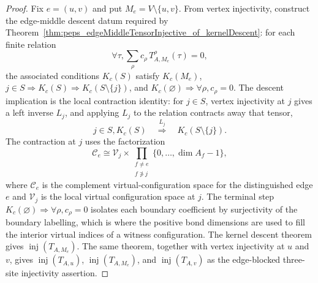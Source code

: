 \begin{proof}\leanok
    Fix $e=(u,v)$ and put $M_e=V\setminus\{u,v\}$. From vertex injectivity,
    construct the edge-middle descent datum required by
    Theorem~\ref{thm:peps_edgeMiddleTensorInjective_of_kernelDescent}: for each
    finite relation
    \[
        \forall \tau,
        \sum_{\rho} c_{\rho}\,T_{A,M_e}^{\rho}(\tau)=0,
    \]
    the associated conditions $K_c(S)$ satisfy $K_c(M_e)$,
    $j\in S\Longrightarrow K_c(S)\Longrightarrow K_c(S\setminus\{j\})$, and
    $K_c(\varnothing)\Longrightarrow \forall\rho, c_{\rho}=0$. The descent
    implication is the local contraction identity: for $j\in S$, vertex
    injectivity at $j$ gives a left inverse $L_j$, and applying $L_j$ to the
    relation contracts away that tensor,
    \[
        j\in S, K_c(S)\quad\stackrel{L_j}{\Longrightarrow}\quad
        K_c(S\setminus\{j\}).
    \]
    The contraction at $j$ uses the factorization
    \[
        \mathcal C_e
        \cong
        \mathcal V_j
        \times
        \prod_{\substack{f\ne e\\ f\not\ni j}}
        \{0,\ldots,\dim A_f-1\},
    \]
    where $\mathcal C_e$ is the complement virtual-configuration space for
    the distinguished edge $e$ and $\mathcal V_j$ is the local virtual
    configuration space at $j$. The terminal step
    $K_c(\varnothing)\Longrightarrow \forall\rho, c_{\rho}=0$ isolates each
    boundary coefficient by surjectivity of the boundary labelling, which is
    where the positive bond dimensions are used to fill the interior virtual
    indices of a witness configuration.
    The kernel descent theorem gives $\operatorname{inj}(T_{A,M_e})$. The same
    theorem, together with vertex injectivity at $u$ and $v$, gives
    $\operatorname{inj}(T_{A,u})$, $\operatorname{inj}(T_{A,M_e})$, and
    $\operatorname{inj}(T_{A,v})$ as the edge-blocked three-site injectivity
    assertion.
\end{proof}

